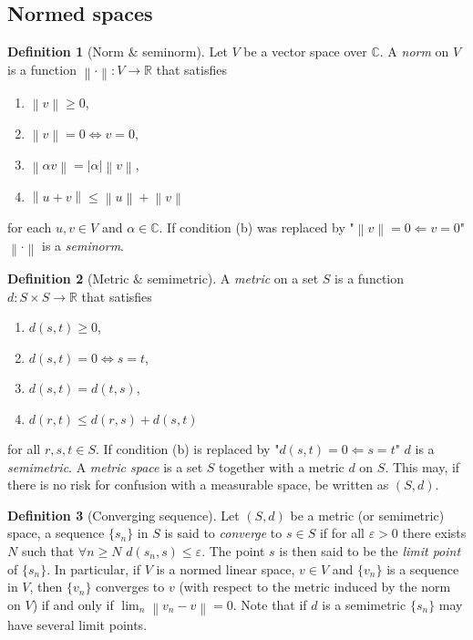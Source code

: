 \documentclass[12pt]{article}
\theoremstyle{definition}
\newtheorem{definition}{Definition}[section]
\newcommand{\real}{\mathbb{R}}   %
\newcommand{\eps}{\varepsilon}    %
\newcommand{\C}{\mathbb{C}}    %
\newcommand\norm[1]{\left\lVert#1\right\rVert}
\begin{document}
\subsection{Normed spaces}
\begin{definition}[Norm \& seminorm]
    Let $V$ be a vector space over $\C$. A \textit{norm} on $V$ is a function $\norm{\cdot}:V \to \real$ that satisfies
    \begin{enumerate}[label=(\alph*)]
        \item $\norm{v}\geq 0$,
        \item $\norm{v}=0 \Longleftrightarrow v=0$,
        \item $\norm{\alpha v}=|\alpha|\norm{v}$,
        \item $\norm{u+v}\leq \norm{u}+\norm{v}$
    \end{enumerate}
    for each $u,v\in V$ and $\alpha\in \C$. If condition (b) was replaced by "$\norm{v}=0 \Longleftarrow v=0$" $\norm{\cdot}$ is a \textit{seminorm}.
\end{definition}
\begin{definition}[Metric \& semimetric]
    A \textit{metric} on a set $S$ is a function $d:S\times S\to \real$ that satisfies
    \begin{enumerate}[label=(\alph*)]
        \item $d(s,t)\geq 0$,
        \item $d(s,t)=0 \Longleftrightarrow s=t$,
        \item $d(s,t)=d(t,s)$,
        \item $d(r,t)\leq d(r,s)+d(s,t)$
    \end{enumerate}
    for all $r,s,t\in S$. If condition (b) is replaced by "$d(s,t)=0 \Longleftarrow s=t$" $d$ is a \textit{semimetric}. A \textit{metric space} is a set $S$ together with a metric $d$ on $S$. This may, if there is no risk for confusion with a measurable space, be written as $(S,d)$.
\end{definition}
\begin{definition}[Converging sequence]
    Let $(S,d)$ be a metric (or semimetric) space, a sequence $\{s_n\}$ in $S$ is said to \textit{converge} to $s\in S$ if for all $\eps>0$ there exists $N$ such that $\forall n \geq N$ $d(s_n,s)\leq\eps$. The point $s$ is then said to be the \textit{limit point} of $\{s_n\}$. In particular, if $V$ is a normed linear space, $v\in V$ and $\{v_n\}$ is a sequence in $V$, then $\{v_n\}$ converges to $v$ (with respect to the metric induced by the norm on $V$) if and only if $\lim_n \norm{v_n-v}=0$. Note that if $d$ is a semimetric $\{s_n\}$ may have several limit points.
\end{definition}
\end{document}
